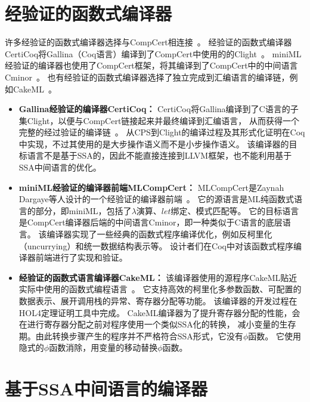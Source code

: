 \section{经验证的函数式编译器} \label{sec:relatedf}

许多经验证的函数式编译器选择与CompCert相连接~\cite{belanger2019certified, dargaye2009verification}。
经验证的函数式编译器CertiCoq将Gallina（Coq语言）编译到了CompCert中使用的的Clight~\cite{belanger2019certified}。
miniML经验证的编译器也使用了CompCert框架，将其编译到了CompCert中的中间语言Cminor~\cite{dargaye2009verification}。
也有经验证的函数式编译器选择了独立完成到汇编语言的编译链，例如CakeML~\cite{cakeml2016}。

\begin{itemize}
    \item \textbf{Gallina经验证的编译器CertiCoq：} 
    CertiCoq将Gallina编译到了C语言的子集Clight，以便与CompCert链接起来并最终编译到汇编语言，
    从而获得一个完整的经过验证的编译链~\cite{belanger2019certified,zoe-oopsla2021,zoe-icfp2021}。
    从CPS到Clight的编译过程及其形式化证明在Coq中实现，不过其使用的是大步操作语义而不是小步操作语义。
    该编译器的目标语言不是基于SSA的，因此不能直接连接到LLVM框架，也不能利用基于SSA中间语言的优化。
    \item \textbf{miniML经验证的编译器前端MLCompCert：} 
    MLCompCert是Zaynah Dargaye等人设计的一个经验证的编译器前端~\cite{dargaye2009verification}。
    它的源语言是ML纯函数式语言的部分，即miniML，包括了$\lambda$演算、$let$绑定、模式匹配等。
    它的目标语言是CompCert编译器后端的中间语言Cminor，即一种类似于C语言的底层语言。
    该编译器实现了一些经典的函数式程序编译优化，例如反柯里化（uncurrying）和统一数据结构表示等。
    设计者们在Coq中对该函数式程序编译器前端进行了实现和验证。
    \item \textbf{经验证的函数式语言编译器CakeML：} 
    该编译器使用的源程序CakeML贴近实际中使用的函数式编程语言~\cite{cakeml2016}。
    它支持高效的柯里化多参数函数、可配置的数据表示、展开调用栈的异常、寄存器分配等功能。
    该编译器的开发过程在HOL4定理证明工具中完成。
    CakeML编译器为了提升寄存器分配的性能，会在进行寄存器分配之前对程序使用一个类似SSA化的转换，
    减小变量的生存期。由此转换步骤产生的程序并不严格符合SSA形式，它没有$\phi$函数。
    它使用隐式的$\phi$函数消除，用变量的移动替换$\phi$函数。
\end{itemize}


\section{基于SSA中间语言的编译器} \label{sec:relatedssa}


